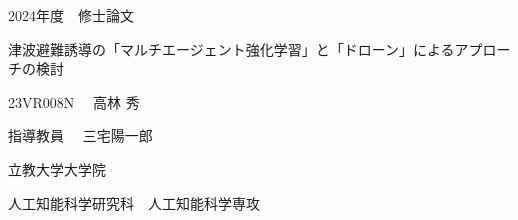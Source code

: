 \documentclass[a4paper, 12pt]{bxjsreport}
\begin{document}
\begin{titlepage}
    \begin{center}

        

        \vspace{50truept}


        



        {\headfont \Large 2024年度　修士論文}
        \vspace{20truept}

        {\headfont \Huge 津波避難誘導の「マルチエージェント強化学習」と「ドローン」によるアプローチの検討}
        \vspace{160truept}
        
        {\headfont \Large 23VR008N　 \LARGE 高林 秀}\\ \vspace{10truept}
        
        \vspace{20truept}

        {\headfont \Large 指導教員　 三宅陽一郎}
        
        \vspace{100truept}

        {\headfont \Large 立教大学大学院}
        
        \vspace{10truept}
        
        {\headfont \Large 人工知能科学研究科　人工知能科学専攻}

    \end{center}
\end{titlepage}
\end{document}

